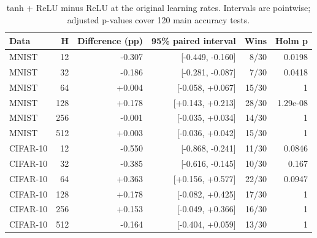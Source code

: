 \begin{table}[htbp]
\centering
\caption{tanh + ReLU minus ReLU at the original learning rates. Intervals are pointwise; adjusted p-values cover 120 main accuracy tests.}
\label{tab:paired}
\small
\begin{tabular}{@{}lrrrrr@{}}
\toprule
Data & H & Difference (pp) & 95\% paired interval & Wins & Holm p \\
\midrule
MNIST & 12 & -0.307 & [-0.449, -0.160] & 8/30 & 0.0198 \\
MNIST & 32 & -0.186 & [-0.281, -0.087] & 7/30 & 0.0418 \\
MNIST & 64 & +0.004 & [-0.058, +0.067] & 15/30 & 1 \\
MNIST & 128 & +0.178 & [+0.143, +0.213] & 28/30 & 1.29e-08 \\
MNIST & 256 & -0.001 & [-0.035, +0.034] & 14/30 & 1 \\
MNIST & 512 & +0.003 & [-0.036, +0.042] & 15/30 & 1 \\
CIFAR-10 & 12 & -0.550 & [-0.868, -0.241] & 11/30 & 0.0846 \\
CIFAR-10 & 32 & -0.385 & [-0.616, -0.145] & 10/30 & 0.167 \\
CIFAR-10 & 64 & +0.363 & [+0.156, +0.577] & 22/30 & 0.0947 \\
CIFAR-10 & 128 & +0.178 & [-0.082, +0.425] & 17/30 & 1 \\
CIFAR-10 & 256 & +0.153 & [-0.049, +0.366] & 16/30 & 1 \\
CIFAR-10 & 512 & -0.164 & [-0.404, +0.059] & 13/30 & 1 \\
\bottomrule
\end{tabular}
\end{table}
